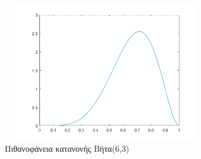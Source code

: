 \begin{figure}
\centering
\includegraphics[width=90mm, height=60mm]{../../plots/Consumption_Analysis/beta_6_3.png}
\caption{Πιθανοφάνεια κατανονής Βήτα(6,3) \label{beta63}}
\end{figure}
